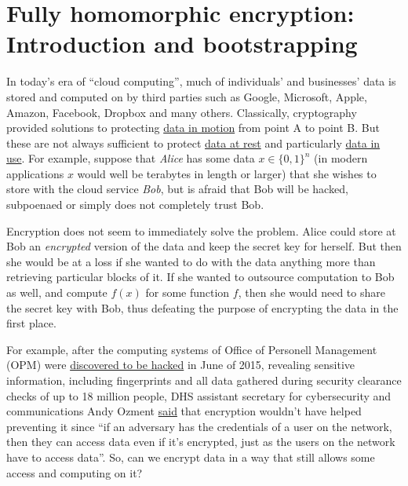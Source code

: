 \chapter{Fully homomorphic encryption: Introduction and
bootstrapping}\label{Fully-homomorphic-encrypt}

In today's era of ``cloud computing'', much of individuals' and
businesses' data is stored and computed on by third parties such as
Google, Microsoft, Apple, Amazon, Facebook, Dropbox and many others.
Classically, cryptography provided solutions to protecting
\href{https://www.schneier.com/blog/archives/2010/06/data_at_rest_vs.html}{data
in motion} from point A to point B. But these are not always sufficient
to protect \href{https://en.wikipedia.org/wiki/Data_at_rest}{data at
rest} and particularly
\href{https://en.wikipedia.org/wiki/Data_in_use}{data in use}. For
example, suppose that \emph{Alice} has some data \(x \in \{0,1\}^n\) (in
modern applications \(x\) would well be terabytes in length or larger)
that she wishes to store with the cloud service \emph{Bob}, but is
afraid that Bob will be hacked, subpoenaed or simply does not completely
trust Bob.

Encryption does not seem to immediately solve the problem. Alice could
store at Bob an \emph{encrypted} version of the data and keep the secret
key for herself. But then she would be at a loss if she wanted to do
with the data anything more than retrieving particular blocks of it. If
she wanted to outsource computation to Bob as well, and compute \(f(x)\)
for some function \(f\), then she would need to share the secret key
with Bob, thus defeating the purpose of encrypting the data in the first
place.

For example, after the computing systems of Office of Personell
Management (OPM) were
\href{https://www.lawfareblog.com/why-opm-hack-far-worse-you-imagine}{discovered
to be hacked} in June of 2015, revealing sensitive information,
including fingerprints and all data gathered during security clearance
checks of up to 18 million people, DHS assistant secretary for
cybersecurity and communications Andy Ozment
\href{http://www.federaltimes.com/story/government/omr/opm-cyber-report/2015/06/19/opm-breach-encryption/28985237/}{said}
that encryption wouldn't have helped preventing it since ``if an
adversary has the credentials of a user on the network, then they can
access data even if it's encrypted, just as the users on the network
have to access data''. So, can we encrypt data in a way that still
allows some access and computing on it?

